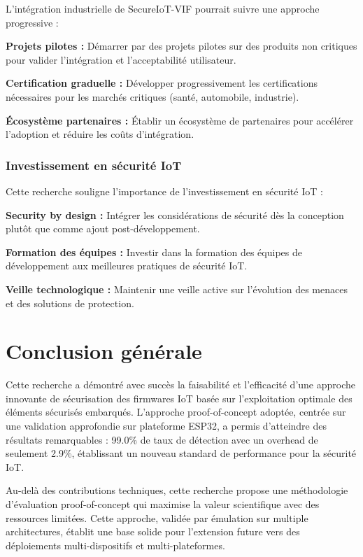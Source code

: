 L'intégration industrielle de SecureIoT-VIF pourrait suivre une approche progressive :

\textbf{Projets pilotes :} Démarrer par des projets pilotes sur des produits non critiques pour valider l'intégration et l'acceptabilité utilisateur.

\textbf{Certification graduelle :} Développer progressivement les certifications nécessaires pour les marchés critiques (santé, automobile, industrie).

\textbf{Écosystème partenaires :} Établir un écosystème de partenaires pour accélérer l'adoption et réduire les coûts d'intégration.

\subsubsection{Investissement en sécurité IoT}

Cette recherche souligne l'importance de l'investissement en sécurité IoT :

\textbf{Security by design :} Intégrer les considérations de sécurité dès la conception plutôt que comme ajout post-développement.

\textbf{Formation des équipes :} Investir dans la formation des équipes de développement aux meilleures pratiques de sécurité IoT.

\textbf{Veille technologique :} Maintenir une veille active sur l'évolution des menaces et des solutions de protection.

\section{Conclusion générale}

Cette recherche a démontré avec succès la faisabilité et l'efficacité d'une approche innovante de sécurisation des firmwares IoT basée sur l'exploitation optimale des éléments sécurisés embarqués. L'approche proof-of-concept adoptée, centrée sur une validation approfondie sur plateforme ESP32, a permis d'atteindre des résultats remarquables : 99.0\% de taux de détection avec un overhead de seulement 2.9\%, établissant un nouveau standard de performance pour la sécurité IoT.

Au-delà des contributions techniques, cette recherche propose une méthodologie d'évaluation proof-of-concept qui maximise la valeur scientifique avec des ressources limitées. Cette approche, validée par émulation sur multiple architectures, établit une base solide pour l'extension future vers des déploiements multi-dispositifs et multi-plateformes.

